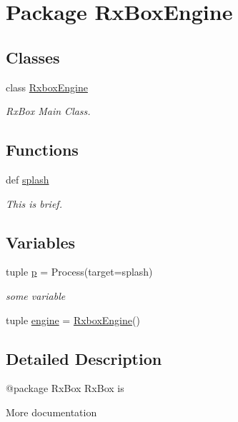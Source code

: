 \hypertarget{namespace_rx_box_engine}{
\section{Package RxBoxEngine}
\label{namespace_rx_box_engine}
}
\subsection*{Classes}
\begin{DoxyCompactItemize}
\item 
class \hyperlink{class_rx_box_engine_1_1_rxbox_engine}{RxboxEngine}
\begin{DoxyCompactList}\small\item\em RxBox Main Class. \end{DoxyCompactList}\end{DoxyCompactItemize}
\subsection*{Functions}
\begin{DoxyCompactItemize}
\item 
def \hyperlink{namespace_rx_box_engine_a6a12973ebbd9ccf2f7f979d9e8b0705d}{splash}
\begin{DoxyCompactList}\small\item\em This is brief. \end{DoxyCompactList}\end{DoxyCompactItemize}
\subsection*{Variables}
\begin{DoxyCompactItemize}
\item 
tuple \hyperlink{namespace_rx_box_engine_ab0945a1065c774e9d60e985557378e8f}{p} = Process(target=splash)
\begin{DoxyCompactList}\small\item\em some variable \end{DoxyCompactList}\item 
tuple \hyperlink{namespace_rx_box_engine_ab8a9ae1ed61d7eb38ff46dee8f4b3e30}{engine} = \hyperlink{class_rx_box_engine_1_1_rxbox_engine}{RxboxEngine}()
\end{DoxyCompactItemize}


\subsection{Detailed Description}
\begin{DoxyVerb}
@package RxBox
RxBox is 

More documentation
\end{DoxyVerb}
 

